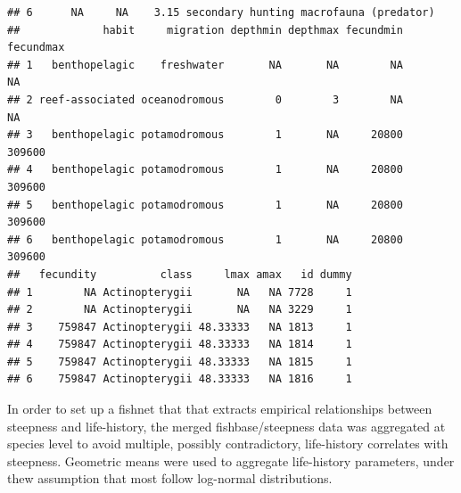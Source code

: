 \documentclass{dragonfly-report}\usepackage[]{graphicx}\usepackage[]{color}
\makeatletter
\newenvironment{kframe}{%
 \def\at@end@of@kframe{}%
 \ifinner\ifhmode%
  \def\at@end@of@kframe{\end{minipage}}%
  \begin{minipage}{\columnwidth}%
 \fi\fi%
 \def\FrameCommand##1{\hskip\@totalleftmargin \hskip-\fboxsep
 \colorbox{shadecolor}{##1}\hskip-\fboxsep
     \hskip-\linewidth \hskip-\@totalleftmargin \hskip\columnwidth}%
 \MakeFramed {\advance\hsize-\width
   \@totalleftmargin\z@ \linewidth\hsize
   \@setminipage}}%
 {\par\unskip\endMakeFramed%
 \at@end@of@kframe}
\newenvironment{knitrout}{}{} %
\makeatother
\begin{document}
\begin{knitrout}
\begin{kframe}
\begin{verbatim}
## 6      NA     NA    3.15 secondary hunting macrofauna (predator)
##             habit     migration depthmin depthmax fecundmin fecundmax
## 1   benthopelagic    freshwater       NA       NA        NA        NA
## 2 reef-associated oceanodromous        0        3        NA        NA
## 3   benthopelagic potamodromous        1       NA     20800    309600
## 4   benthopelagic potamodromous        1       NA     20800    309600
## 5   benthopelagic potamodromous        1       NA     20800    309600
## 6   benthopelagic potamodromous        1       NA     20800    309600
##   fecundity          class     lmax amax   id dummy
## 1        NA Actinopterygii       NA   NA 7728     1
## 2        NA Actinopterygii       NA   NA 3229     1
## 3    759847 Actinopterygii 48.33333   NA 1813     1
## 4    759847 Actinopterygii 48.33333   NA 1814     1
## 5    759847 Actinopterygii 48.33333   NA 1815     1
## 6    759847 Actinopterygii 48.33333   NA 1816     1
\end{verbatim}
\end{kframe}
\end{knitrout}

In order to set up a fishnet that that extracts empirical relationships between steepness and life-history, the merged fishbase/steepness data was aggregated at species level to avoid multiple, possibly contradictory, life-history correlates with steepness. Geometric means were used to aggregate life-history parameters, under thew assumption that most follow log-normal distributions.
\end{document}

